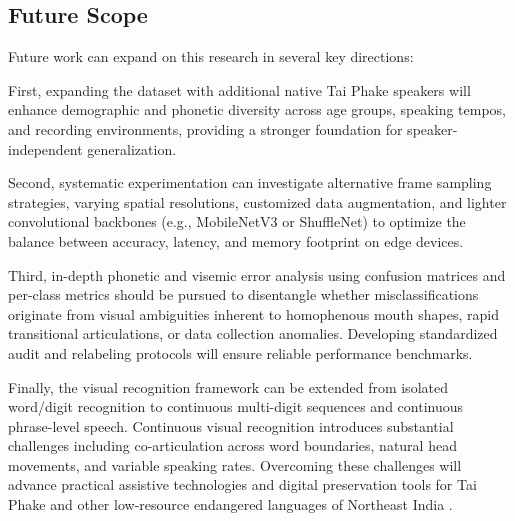 \documentclass[journal]{IEEEtran}
\begin{document}
\subsection{Future Scope}

Future work can expand on this research in several key directions:

First, expanding the dataset with additional native Tai Phake speakers will enhance demographic and phonetic diversity across age groups, speaking tempos, and recording environments, providing a stronger foundation for speaker-independent generalization.

Second, systematic experimentation can investigate alternative frame sampling strategies, varying spatial resolutions, customized data augmentation, and lighter convolutional backbones (e.g., MobileNetV3 or ShuffleNet) to optimize the balance between accuracy, latency, and memory footprint on edge devices.

Third, in-depth phonetic and visemic error analysis using confusion matrices and per-class metrics should be pursued to disentangle whether misclassifications originate from visual ambiguities inherent to homophenous mouth shapes, rapid transitional articulations, or data collection anomalies. Developing standardized audit and relabeling protocols will ensure reliable performance benchmarks.

Finally, the visual recognition framework can be extended from isolated word/digit recognition to continuous multi-digit sequences and continuous phrase-level speech. Continuous visual recognition introduces substantial challenges including co-articulation across word boundaries, natural head movements, and variable speaking rates. Overcoming these challenges will advance practical assistive technologies and digital preservation tools for Tai Phake and other low-resource endangered languages of Northeast India \cite{sheng2024visual}.



\end{document}
